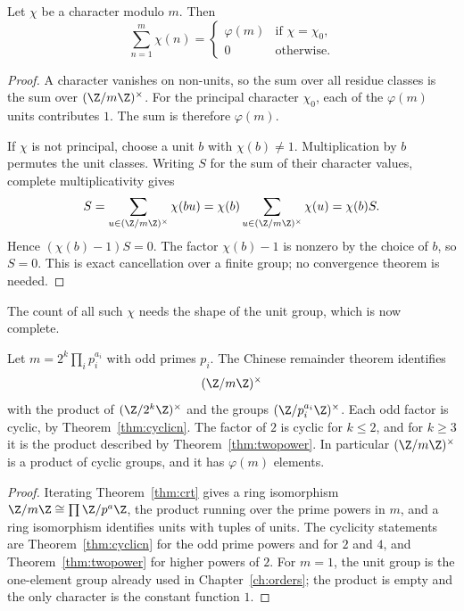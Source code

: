 \begin{proposition}\label{prop:t1-charsum}
Let $\chi$ be a character modulo $m$. Then
\[
\sum_{n=1}^m\chi(n)=\begin{cases}\varphi(m)&\text{if }\chi=\chi_0,\\0&\text{otherwise.}\end{cases}
\]
\end{proposition}
\begin{proof}
A character vanishes on non-units, so the sum
over all residue classes is the sum over
$(\Z/m\Z)^\times$.
For the principal character $\chi_0$, each
of the $\varphi(m)$ units contributes $1$.
The sum is therefore $\varphi(m)$.

If $\chi$ is not principal, choose a unit $b$
with $\chi(b)\ne1$. Multiplication by $b$
permutes the unit classes. Writing $S$ for
the sum of their character values, complete
multiplicativity gives
\[
S=\sum_{u\in(\Z/m\Z)^\times}\chi(bu)
 =\chi(b)\sum_{u\in(\Z/m\Z)^\times}\chi(u)
 =\chi(b)S.
\]
Hence $(\chi(b)-1)S=0$. The factor
$\chi(b)-1$ is nonzero by the choice of
$b$, so $S=0$. This is exact cancellation
over a finite group; no convergence theorem
is needed.
\end{proof}

The count of all such $\chi$ needs the shape of the unit group, which is now complete.

\begin{proposition}\label{prop:t1-unitproduct}
Let $m=2^k\prod_ip_i^{a_i}$ with odd primes $p_i$. The Chinese remainder theorem identifies
\[
(\Z/m\Z)^\times
\]
with the product of $(\Z/2^k\Z)^\times$ and the groups $(\Z/p_i^{a_i}\Z)^\times$. Each odd factor is cyclic, by Theorem~\ref{thm:cyclicn}. The factor of $2$ is cyclic for $k\le2$, and for $k\ge3$ it is the product described by Theorem~\ref{thm:twopower}. In particular $(\Z/m\Z)^\times$ is a product of cyclic groups, and it has $\varphi(m)$ elements.
\end{proposition}
\begin{proof}
Iterating Theorem~\ref{thm:crt} gives a ring isomorphism $\Z/m\Z\cong\prod\Z/p^{a}\Z$, the product running over the prime powers in $m$, and a ring isomorphism identifies units with tuples of units. The cyclicity statements are Theorem~\ref{thm:cyclicn} for the odd prime powers and for $2$ and $4$, and Theorem~\ref{thm:twopower} for higher powers of $2$.
For $m=1$, the unit group is the one-element group already used in Chapter~\ref{ch:orders}; the product is empty and the only character is the constant function $1$.
\end{proof}


